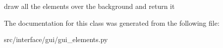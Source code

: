 \begin{DoxyVerb}draw all the elements over the background and return it \end{DoxyVerb}
 

\-The documentation for this class was generated from the following file\-:\begin{DoxyCompactItemize}
\item 
src/interface/gui/gui\-\_\-elements.\-py\end{DoxyCompactItemize}
